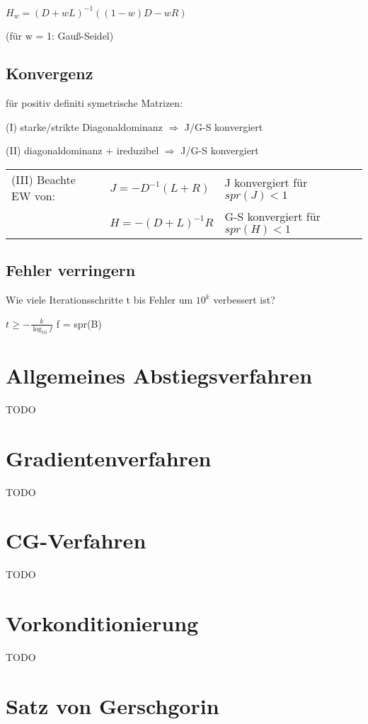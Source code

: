 \documentclass[12pt,a4paper]{article} %
\newcommand*\tab[1][1cm]{\hspace*{#1}}
\begin{document}
	$H_w = (D + wL)^{-1}((1 - w)D - wR)$
	
	(für w = 1: Gauß-Seidel)
	
	\subsection{Konvergenz}
	
	für positiv definiti symetrische Matrizen:
	
	(I) starke/strikte Diagonaldominanz $\Rightarrow$ J/G-S konvergiert
	
	(II) diagonaldominanz + ireduzibel $\Rightarrow$ J/G-S konvergiert
	
	\begin{tabular}{l l l}
		(III) Beachte EW von: & $J = -D^{-1}(L + R)$ & J konvergiert für $spr(J) < 1$ \\
		& $H = -(D + L)^{-1}R$ & G-S konvergiert für $spr(H) < 1$
	\end{tabular}
	
	\subsection{Fehler verringern}
	
	Wie viele Iterationsschritte t bis Fehler um $10^k$ verbessert ist?
	
	$t \ge -\frac{k}{\log_{10}f}$ \tab f = spr(B)
	
	\section{Allgemeines Abstiegsverfahren}
	
	TODO
	
	\section{Gradientenverfahren}
	
	TODO
	
	\section{CG-Verfahren}
	
	TODO
	
	\section{Vorkonditionierung}
	
	TODO
	
	\section{Satz von Gerschgorin}
	
\end{document}
